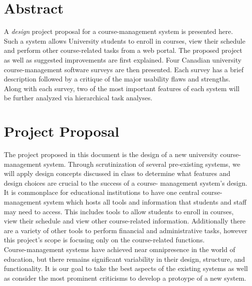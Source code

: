 \documentclass[10pt]{article}
\begin{document}
\begin{multicols}{2}

\section*{Abstract}
A \emph{design} project proposal for a course-management system is presented 
here. Such a system allows University students to enroll in courses, view their 
schedule and perform other course-related tasks from a web portal. The proposed 
project as well as suggested improvements are first explained. Four Canadian 
university course-management software surveys are then presented. Each survey 
has a brief description followed by a critique of the major usability flaws and 
strengths. Along with each survey, two of the most important features of each 
system will be further analyzed via hierarchical task analyses. 

\section*{Project Proposal}

The project proposed in this document is the design of a new 
university course-management system. Through scrutinization of several 
pre-existing systems, we will apply design concepts discussed in class to 
determine what features and design choices are crucial to the success of a course-
management system's design.\\

It is commonplace for educational institutions to have one central course-
management system which hosts all tools and information that students and staff 
may need to access. This includes tools to allow students to enroll in courses, 
view their schedule and view other course-related information. Additionally 
there are a variety of other tools to perform financial and administrative 
tasks, however this project's scope is focusing only on the course-related 
functions.\\

Course-management systems have achieved near omnipresence in 
the world of education, but there remains significant variability in their design, 
structure, and functionality. It is our goal to take the best aspects of the 
existing systems as well as consider the most prominent criticisms to develop a protoype of a new system.\\


\end{multicols}
\end{document}
